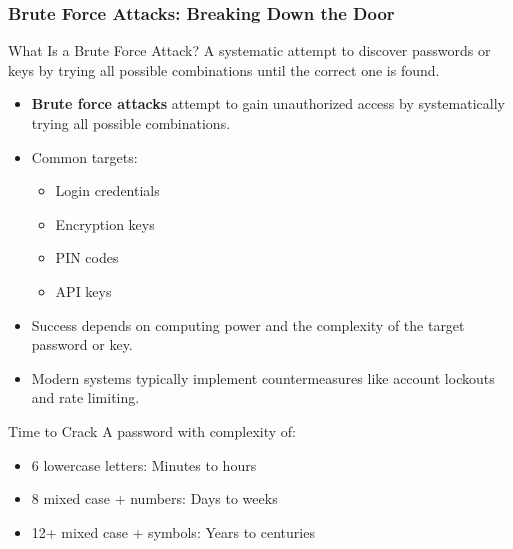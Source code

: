 \documentclass{beamer}
\begin{document}
\begin{frame}
    \frametitle{Brute Force Attacks: Breaking Down the Door}
    
    \begin{block}{What Is a Brute Force Attack?}
        A systematic attempt to discover passwords or keys by trying all possible combinations until the correct one is found.
    \end{block}
    
    \begin{itemize}
        \item \textbf{Brute force attacks} attempt to gain unauthorized access by systematically trying all possible combinations.
        \item Common targets:
            \begin{itemize}
                \item Login credentials
                \item Encryption keys
                \item PIN codes
                \item API keys
            \end{itemize}
        \item Success depends on computing power and the complexity of the target password or key.
        \item Modern systems typically implement countermeasures like account lockouts and rate limiting.
    \end{itemize}
    
    \begin{alertblock}{Time to Crack}
        \small
        A password with complexity of:
        \begin{itemize}
            \item 6 lowercase letters: Minutes to hours
            \item 8 mixed case + numbers: Days to weeks
            \item 12+ mixed case + symbols: Years to centuries
        \end{itemize}
    \end{alertblock}
\end{frame}
\end{document}
